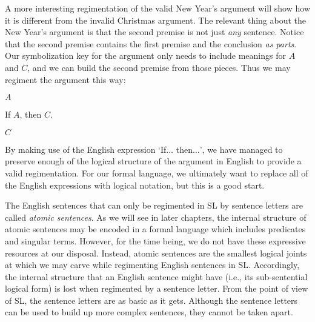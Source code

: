 A more interesting regimentation of the valid New Year's argument will show how it is different from the invalid Christmas argument.
The relevant thing about the New Year's argument is that the second premise is not just \emph{any} sentence.
Notice that the second premise contains the first premise and the conclusion \emph{as parts}.
Our symbolization key for the argument only needs to include meanings for $A$ and $C$, and we can build the second premise from those pieces.
Thus we may regiment the argument this way:

\begin{earg}
\item[] $A$
\item[] If $A$, then $C$.
\item[\therefore] $C$
\end{earg}

By making use of the English expression `If$\ldots$ then$\ldots$', we have managed to preserve enough of the logical structure of the argument in English to provide a valid regimentation.
For our formal language, we ultimately want to replace all of the English expressions with logical notation, but this is a good start.

The English sentences that can only be regimented in SL by sentence letters are called \emph{atomic sentences}.
As we will see in later chapters, the internal structure of atomic sentences may be encoded in a formal language which includes predicates and singular terms.
However, for the time being, we do not have these expressive resources at our disposal.
Instead, atomic sentences are the smallest logical joints at which we may carve while regimenting English sentences in SL.
Accordingly, the internal structure that an English sentence might have (i.e., its sub-sentential logical form) is lost when regimented by a sentence letter.
From the point of view of SL, the sentence letters are as basic as it gets.
Although the sentence letters can be used to build up more complex sentences, they cannot be taken apart.



